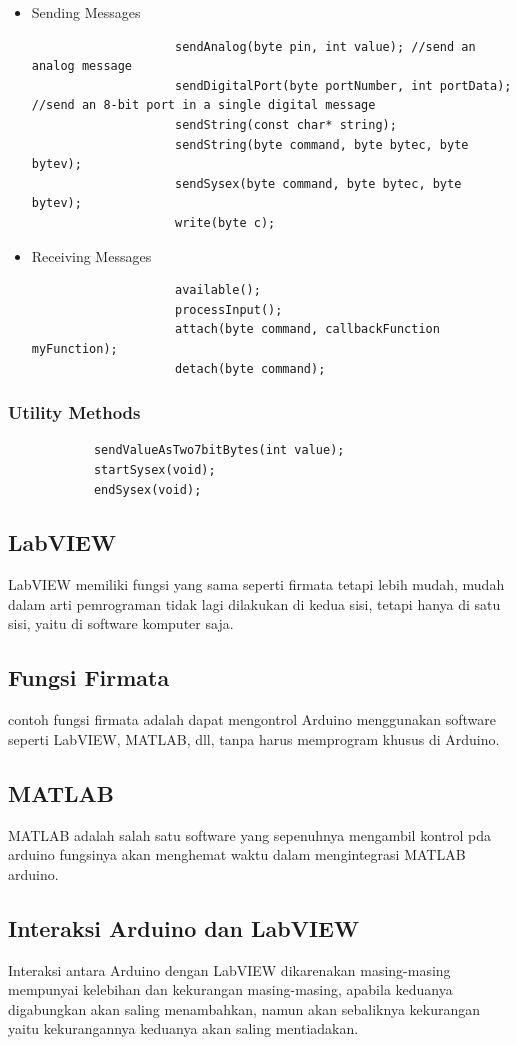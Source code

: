 		\begin{itemize}
			\item Sending Messages
				\begin{verbatim}
					sendAnalog(byte pin, int value); //send an analog message
					sendDigitalPort(byte portNumber, int portData); //send an 8-bit port in a single digital message
					sendString(const char* string); 
					sendString(byte command, byte bytec, byte bytev); 
					sendSysex(byte command, byte bytec, byte bytev); 
					write(byte c); 
				\end{verbatim}
			\item Receiving Messages
				\begin{verbatim}
					available(); 
					processInput(); 
					attach(byte command, callbackFunction myFunction); 
					detach(byte command); 
				\end{verbatim}
		\end{itemize}
	
	\subsubsection{Utility Methods}
		\begin{verbatim}
			sendValueAsTwo7bitBytes(int value); 
			startSysex(void); 
			endSysex(void); 
		\end{verbatim}
	
	\subsection{LabVIEW}
	LabVIEW memiliki fungsi yang sama seperti firmata tetapi lebih mudah, mudah dalam arti pemrograman tidak lagi dilakukan di kedua sisi,
	tetapi hanya di satu sisi, yaitu di software komputer saja.
	
	\subsection{Fungsi Firmata}
	contoh fungsi firmata adalah dapat mengontrol Arduino menggunakan software seperti LabVIEW, MATLAB, dll, tanpa harus memprogram khusus di Arduino.
	
	\subsection{MATLAB}
	MATLAB adalah salah satu software yang sepenuhnya mengambil kontrol pda arduino fungsinya akan menghemat waktu dalam mengintegrasi MATLAB arduino.
	
	\subsection{Interaksi Arduino dan LabVIEW}
	Interaksi antara Arduino dengan LabVIEW dikarenakan masing-masing mempunyai kelebihan dan kekurangan masing-masing, apabila keduanya digabungkan akan saling menambahkan, namun akan sebaliknya kekurangan yaitu kekurangannya keduanya akan saling mentiadakan.
	
